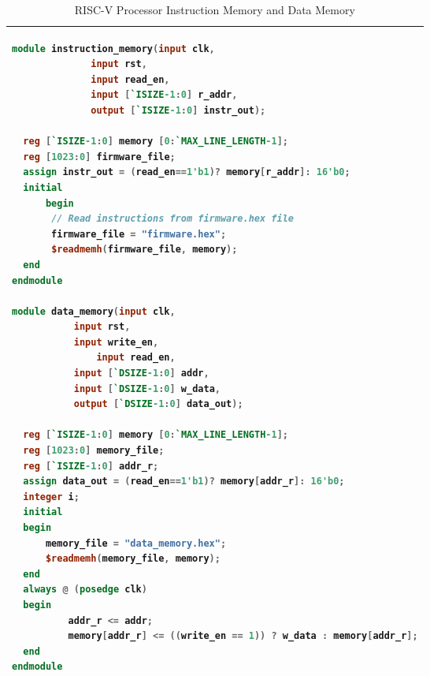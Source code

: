 \begin{table}[!h]
\centering
\caption{RISC-V Processor Instruction Memory and Data Memory}
\label{riscvcode5:top}
\begin{tabular}{l}
\toprule
\begin{lstlisting}[columns=fullflexible, language=Verilog]
module instruction_memory(input clk, 
			  input rst, 
			  input read_en, 
			  input [`ISIZE-1:0] r_addr, 
			  output [`ISIZE-1:0] instr_out);

  reg [`ISIZE-1:0] memory [0:`MAX_LINE_LENGTH-1];
  reg [1023:0] firmware_file;
  assign instr_out = (read_en==1'b1)? memory[r_addr]: 16'b0;
  initial 
      begin 
	   // Read instructions from firmware.hex file
	   firmware_file = "firmware.hex";
	   $readmemh(firmware_file, memory);
  end
endmodule

module data_memory(input clk, 
		   input rst, 
		   input write_en,
    		   input read_en, 
		   input [`DSIZE-1:0] addr,
 		   input [`DSIZE-1:0] w_data,
		   output [`DSIZE-1:0] data_out);

  reg [`ISIZE-1:0] memory [0:`MAX_LINE_LENGTH-1];
  reg [1023:0] memory_file;
  reg [`ISIZE-1:0] addr_r;
  assign data_out = (read_en==1'b1)? memory[addr_r]: 16'b0;
  integer i;
  initial 
  begin
      memory_file = "data_memory.hex";
      $readmemh(memory_file, memory);
  end
  always @ (posedge clk)
  begin
          addr_r <= addr;
          memory[addr_r] <= ((write_en == 1)) ? w_data : memory[addr_r];
  end
endmodule
\end{lstlisting}
\\
\bottomrule
\end{tabular}
\end{table}
   

